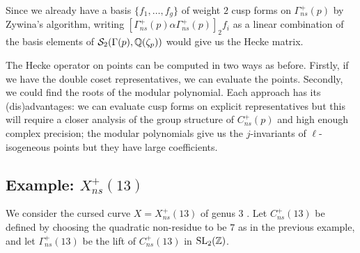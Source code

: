Since we already have a basis $\{f_1, \ldots, f_g \}$ of weight $2$ cusp forms on $\Gamma_{ns}^+(p)$ by Zywina's algorithm, writing $[\Gamma_{ns}^+(p)\alpha\Gamma_{ns}^+(p)]_2 f_i $ as a linear combination of the basis elements of $\mathcal{S}_2(\Gamma(p), \mathbb{Q}(\zeta_p))$ would give us the Hecke matrix.

The Hecke operator on points can be computed in two ways as before. Firstly, if we have the double coset representatives, we can evaluate the points. Secondly, we could find the roots of the modular polynomial. Each approach has its (dis)advantages: we can evaluate cusp forms on explicit representatives but this will require a closer analysis of the group structure of $C_{ns}^+(p)$ and high enough complex precision; the modular polynomials give us the $j$-invariants of $\ell$-isogeneous points but they have large coefficients.

\subsection{Example: $X_{ns}^+(13)$}

We consider the cursed curve $X = X_{ns}^+(13)$ of genus $3$ \cite{cursed-curve}. Let $C_{ns}^+(13)$ be defined by choosing the quadratic non-residue to be $7$ as in the previous example, and let $\Gamma_{ns}^+(13)$ be the lift of $C_{ns}^+(13)$ in $\operatorname{SL}_2(\mathbb{Z})$.

